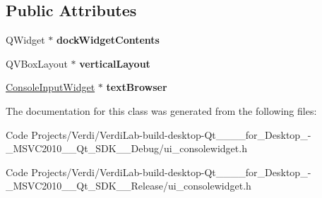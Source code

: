 \subsection*{\-Public \-Attributes}
\begin{DoxyCompactItemize}
\item 
\hypertarget{class_ui___console_widget_aa49fd48a8add11b62155c8341a7c8c93}{\-Q\-Widget $\ast$ {\bfseries dock\-Widget\-Contents}}\label{class_ui___console_widget_aa49fd48a8add11b62155c8341a7c8c93}

\item 
\hypertarget{class_ui___console_widget_a3ae1f45e829b20c5f9b5e1ea3ebb671e}{\-Q\-V\-Box\-Layout $\ast$ {\bfseries vertical\-Layout}}\label{class_ui___console_widget_a3ae1f45e829b20c5f9b5e1ea3ebb671e}

\item 
\hypertarget{class_ui___console_widget_a78e03a06513febb7b598c36752b2ae21}{\hyperlink{class_console_input_widget}{\-Console\-Input\-Widget} $\ast$ {\bfseries text\-Browser}}\label{class_ui___console_widget_a78e03a06513febb7b598c36752b2ae21}

\end{DoxyCompactItemize}


\-The documentation for this class was generated from the following files\-:\begin{DoxyCompactItemize}
\item 
\-Code Projects/\-Verdi/\-Verdi\-Lab-\/build-\/desktop-\/\-Qt\-\_\-\_\-\_\-\_\-for\-\_\-\-Desktop\-\_\--\/\-\_\-\-M\-S\-V\-C2010\-\_\-\-\_\-\-Qt\-\_\-\-S\-D\-K\-\_\-\-\_\-\-Debug/ui\-\_\-consolewidget.\-h\item 
\-Code Projects/\-Verdi/\-Verdi\-Lab-\/build-\/desktop-\/\-Qt\-\_\-\_\-\_\-\_\-for\-\_\-\-Desktop\-\_\--\/\-\_\-\-M\-S\-V\-C2010\-\_\-\-\_\-\-Qt\-\_\-\-S\-D\-K\-\_\-\-\_\-\-Release/ui\-\_\-consolewidget.\-h\end{DoxyCompactItemize}
